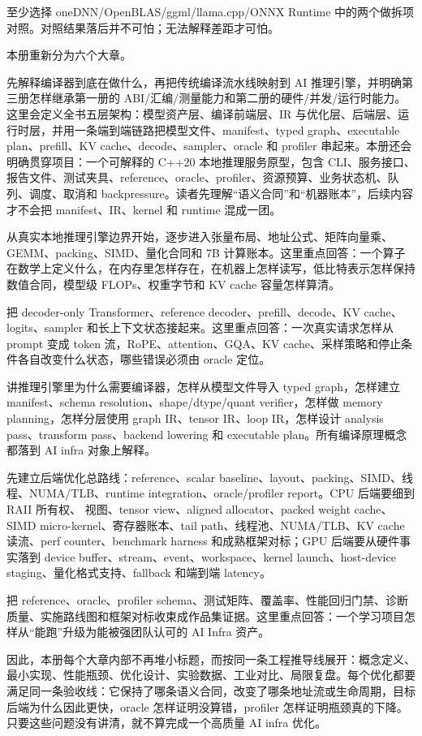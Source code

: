至少选择 oneDNN/OpenBLAS/ggml/llama.cpp/ONNX Runtime 中的两个做拆项对照。对照结果落后并不可怕；无法解释差距才可怕。

本册重新分为六个大章。

 先解释编译器到底在做什么，再把传统编译流水线映射到 AI 推理引擎，并明确第三册怎样继承第一册的 ABI/汇编/测量能力和第二册的硬件/并发/运行时能力。这里会定义全书五层架构：模型资产层、编译前端层、IR 与优化层、后端层、运行时层，并用一条端到端链路把模型文件、manifest、typed graph、executable plan、prefill、KV cache、decode、sampler、oracle 和 profiler 串起来。本册还会明确贯穿项目：一个可解释的 C++20 本地推理服务原型，包含 CLI、服务接口、报告文件、测试夹具、reference、oracle、profiler、资源预算、业务状态机、队列、调度、取消和 backpressure。读者先理解“语义合同”和“机器账本”，后续内容才不会把 manifest、IR、kernel 和 runtime 混成一团。

 从真实本地推理引擎边界开始，逐步进入张量布局、地址公式、矩阵向量乘、GEMM、packing、SIMD、量化合同和 7B 计算账本。这里重点回答：一个算子在数学上定义什么，在内存里怎样存在，在机器上怎样读写，低比特表示怎样保持数值合同，模型级 FLOPs、权重字节和 KV cache 容量怎样算清。

 把 decoder-only Transformer、reference decoder、prefill、decode、KV cache、logits、sampler 和长上下文状态接起来。这里重点回答：一次真实请求怎样从 prompt 变成 token 流，RoPE、attention、GQA、KV cache、采样策略和停止条件各自改变什么状态，哪些错误必须由 oracle 定位。

 讲推理引擎里为什么需要编译器，怎样从模型文件导入 typed graph，怎样建立 manifest、schema resolution、shape/dtype/quant verifier，怎样做 memory planning，怎样分层使用 graph IR、tensor IR、loop IR，怎样设计 analysis pass、transform pass、backend lowering 和 executable plan。所有编译原理概念都落到 AI infra 对象上解释。

 先建立后端优化总路线：reference、scalar baseline、layout、packing、SIMD、线程、NUMA/TLB、runtime integration、oracle/profiler report。CPU 后端要细到 RAII 所有权、 视图、tensor view、aligned allocator、packed weight cache、SIMD micro-kernel、寄存器账本、tail path、线程池、NUMA/TLB、KV cache 读流、perf counter、benchmark harness 和成熟框架对标；GPU 后端要从硬件事实落到 device buffer、stream、event、workspace、kernel launch、host-device staging、量化格式支持、fallback 和端到端 latency。

 把 reference、oracle、profiler schema、测试矩阵、覆盖率、性能回归门禁、诊断质量、实施路线图和框架对标收束成作品集证据。这里重点回答：一个学习项目怎样从“能跑”升级为能被强团队认可的 AI Infra 资产。

因此，本册每个大章内部不再堆小标题，而按同一条工程推导线展开：概念定义、最小实现、性能瓶颈、优化设计、实验数据、工业对比、局限复盘。每个优化都要满足同一条验收线：它保持了哪条语义合同，改变了哪条地址流或生命周期，目标后端为什么因此更快，oracle 怎样证明没算错，profiler 怎样证明瓶颈真的下降。只要这些问题没有讲清，就不算完成一个高质量 AI infra 优化。

